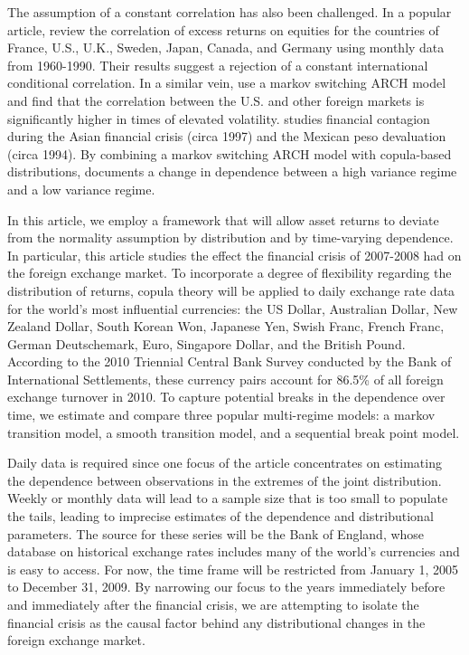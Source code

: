 \documentclass[12pt]{article}
\begin{document}
The assumption of a constant correlation has also been challenged. In a popular article, \cite{Longin_and_Solnik_1995} review the correlation of excess returns on equities for the countries of France, U.S., U.K., Sweden, Japan, Canada, and Germany using monthly data from 1960-1990. Their results suggest a rejection of a constant international conditional correlation. In a similar vein, \cite{Ramchand_and_Susmel_1998} use a markov switching ARCH model and find that the correlation between the U.S. and other foreign markets is significantly higher in times of elevated volatility. \cite{Rodriguez_2007} studies financial contagion during the Asian financial crisis (circa 1997) and the Mexican peso devaluation (circa 1994). By combining a markov switching ARCH model with copula-based distributions, \cite{Rodriguez_2007} documents a change in dependence between a high variance regime and a low variance regime.

In this article, we employ a framework that will allow asset returns to deviate from the normality assumption by distribution and by time-varying dependence. In particular, this article studies the effect the financial crisis of 2007-2008 had on the foreign exchange market. To incorporate a degree of flexibility regarding the distribution of returns, copula theory will be applied to daily exchange rate data for the world's most influential currencies: the US Dollar, Australian Dollar, New Zealand Dollar, South Korean Won, Japanese Yen, Swish Franc, French Franc, German Deutschemark, Euro, Singapore Dollar, and the British Pound. According to the 2010 Triennial Central Bank Survey conducted by the Bank of International Settlements, these currency pairs account for 86.5\% of all foreign exchange turnover in 2010. To capture potential breaks in the dependence over time, we estimate and compare three popular multi-regime models: a markov transition model, a smooth transition model, and a sequential break point model.

Daily data is required since one focus of the article concentrates on estimating the dependence between observations in the extremes of the joint distribution. Weekly or monthly data will lead to a sample size that is too small to populate the tails, leading to imprecise estimates of the dependence and distributional parameters. The source for these series will be the Bank of England, whose database on historical exchange rates includes many of the world's currencies and is easy to access. For now, the time frame will be restricted from January 1, 2005 to December 31, 2009. By narrowing our focus to the years immediately before and immediately after the financial crisis, we are attempting to isolate the financial crisis as the causal factor behind any distributional changes in the foreign exchange market.
\end{document}
